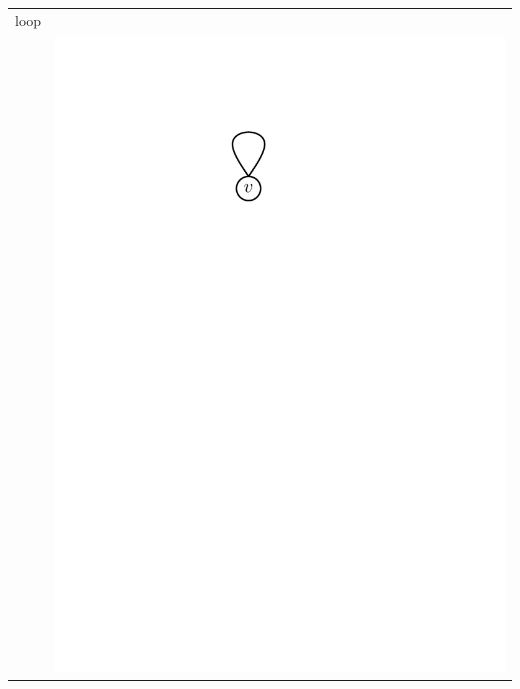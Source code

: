 \begin{tabular}{l l}
loop \\
	& \includegraphics[scale=.5]{01_graph_theory/pics/graph_loop.pdf} \\


\end{tabular}
